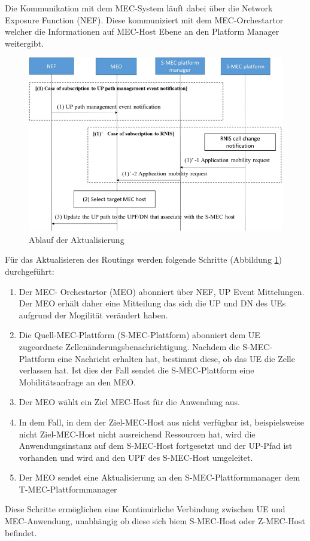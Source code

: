 \documentclass[runningheads]{llncs}
\numberwithin{figure}{section}
\begin{document}
Die Kommunikation mit dem MEC-System läuft dabei über die Network Exposure Function (NEF). Diese kommuniziert mit dem MEC-Orchestartor welcher
die Informationen auf MEC-Host Ebene an den Platform Manager weitergibt.
\begin{figure}
  \includegraphics[width=\linewidth]{images/Datenverkehr_Ablauf.png}
  \caption{Ablauf der Aktualisierung}
  \label{fig:Datenverkehr_Ablauf}
\end{figure}
Für das Aktualisieren des Routings werden folgende Schritte (Abbildung \ref{fig:Datenverkehr_Ablauf}) durchgeführt:
\begin{enumerate}
  \item Der MEC- Orchestartor (MEO) abonniert über NEF, UP Event Mittelungen. Der MEO erhält daher eine Mitteilung das sich die UP und DN des
  UEs aufgrund der Mogilität verändert haben.
  \item Die Quell-MEC-Plattform (S-MEC-Plattform) abonniert dem UE zugeordnete Zellenänderungsbenachrichtigung. 
  Nachdem die S-MEC-Plattform eine Nachricht erhalten hat, bestimmt diese, ob das UE die Zelle verlassen hat. 
  Ist dies der Fall sendet die S-MEC-Plattform eine Mobilitätsanfrage an den MEO.
  \item Der MEO wählt ein Ziel MEC-Host für die Anwendung aus.
  \item In dem Fall, in dem der Ziel-MEC-Host aus nicht verfügbar ist, beispielsweise nicht Ziel-MEC-Host nicht ausreichend Ressourcen hat,
  wird die Anwendungsinstanz auf dem S-MEC-Host fortgesetzt und der UP-Pfad ist vorhanden und wird and den UPF des S-MEC-Host umgeleitet.
  \item Der MEO sendet eine Aktualisierung an den S-MEC-Plattformmanager dem T-MEC-Plattformmanager
\end{enumerate}
Diese Schritte ermöglichen eine Kontinuirliche Verbindung zwischen UE und MEC-Anwendung, unabhängig ob diese sich biem S-MEC-Host oder Z-MEC-Host befindet.
\end{document}

